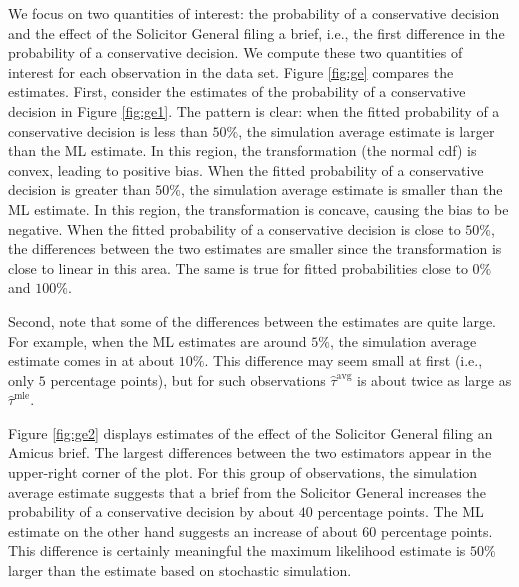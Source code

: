 \documentclass[11pt]{article}
\begin{document}
We focus on two quantities of interest: the probability of a conservative decision and the effect of the Solicitor General filing a brief, i.e., the first difference in the probability of a conservative decision.
We compute these two quantities of interest for each observation in the data set. Figure \ref{fig:ge} compares the estimates.
First, consider the estimates of the probability of a conservative decision in  Figure \ref{fig:ge1}.
The pattern is clear: when the fitted probability of a conservative decision is less than $50\%$, the simulation average estimate is larger than the ML estimate.
In this region, the transformation (the normal cdf) is convex, leading to positive bias.
When the fitted probability of a conservative decision is greater than $50\%$, the simulation average estimate is smaller than the ML estimate.
In this region, the transformation is concave, causing the bias to be negative.
When the fitted probability of a conservative decision is close to $50\%$, the differences between the two estimates are smaller since the transformation is close to linear in this area.
The same is true for fitted probabilities close to $0\%$ and $100\%$.

Second, note that some of the differences between the estimates are quite large.
For example, when the ML estimates are around $5\%$, the simulation average estimate comes in at about $10\%$.
This difference may seem small at first (i.e., only $5$ percentage points), but for such observations $\hat{\tau}^\text{avg}$ is about twice as large as $\hat{\tau}^\text{mle}$.

Figure \ref{fig:ge2} displays estimates of the effect of the Solicitor General filing an Amicus brief.
The largest differences between the two estimators appear in the upper-right corner of the plot.
For this group of observations, the simulation average estimate suggests that a brief from the Solicitor General increases the probability of a conservative decision by about $40$ percentage points.
The ML estimate on the other hand suggests an increase of about $60$ percentage points.
This difference is certainly meaningful \textemdash{} the maximum likelihood estimate is $50\%$ larger than the estimate based on stochastic simulation.

\end{document}
